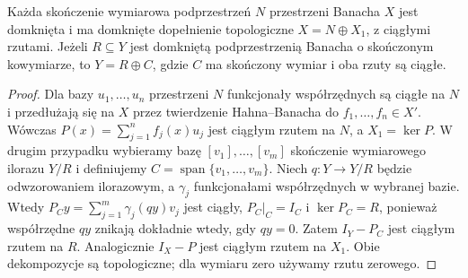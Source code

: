 \begin{lemat}
\label{lem:fredholm-complements30}
Każda skończenie wymiarowa podprzestrzeń $N$ przestrzeni Banacha
$X$ jest domknięta i ma domknięte dopełnienie topologiczne
$X=N\oplus X_1$, z ciągłymi rzutami. Jeżeli $R\subseteq Y$
jest domkniętą podprzestrzenią Banacha o skończonym kowymiarze,
to $Y=R\oplus C$, gdzie $C$ ma skończony wymiar i oba rzuty
są ciągłe.
\end{lemat}
\begin{proof}
Dla bazy $u_1,\ldots,u_n$ przestrzeni $N$ funkcjonały
współrzędnych są ciągłe na $N$ i przedłużają się na $X$
przez twierdzenie Hahna--Banacha do $f_1,\ldots,f_n\in X'$.
Wówczas $P(x)=\sum_{j=1}^n f_j(x)u_j$ jest ciągłym rzutem
na $N$, a $X_1=\ker P$. W drugim przypadku wybieramy bazę
$[v_1],\ldots,[v_m]$ skończenie wymiarowego ilorazu $Y/R$
i definiujemy $C=\operatorname{span}\{v_1,\ldots,v_m\}$.
Niech $q:Y\to Y/R$ będzie odwzorowaniem ilorazowym,
a $\gamma_j$ funkcjonałami współrzędnych w wybranej bazie.
Wtedy $P_Cy=\sum_{j=1}^m\gamma_j(qy)v_j$ jest ciągły,
$P_C|_C=I_C$ i $\ker P_C=R$, ponieważ współrzędne $qy$
znikają dokładnie wtedy, gdy $qy=0$. Zatem $I_Y-P_C$
jest ciągłym rzutem na $R$. Analogicznie $I_X-P$
jest ciągłym rzutem na $X_1$. Obie dekompozycje są
topologiczne; dla wymiaru zero używamy rzutu zerowego.
\end{proof}

